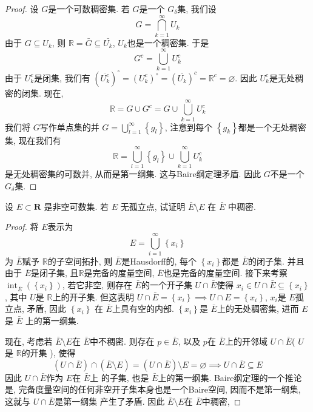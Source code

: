 \documentclass[../main.tex]{subfiles}
\begin{document}
\begin{proof}
   设 \(  G  \)是一个可数稠密集. 若 \(  G  \)是一个 \(  G_{ \delta }  \)集, 我们设 \[
   G= \bigcap _{k= 1}^{\infty}U_{k}
   \]   由于 \(  G\subseteq U_{k}  \), 则 \(  \mathbb{R} = \bar{G}\subseteq \bar{U_{k}}  \), \(  U_{k}  \)也是一个稠密集.   于是 \[
   G^{c}= \bigcup _{k= 1}^{\infty}U_{k}^{c}
   \]由于 \(  U_{k}^{c}  \)是闭集, 我们有  \( \left(  \overline{U_{k}^{c}}  \right)^{\circ}  = \left( U_{k}^{c} \right)^{\circ}  = \left( \overline{U_{k}} \right)^{c} = \mathbb{R} ^{c}= \varnothing \). 因此 \(  U_{k}^{c}  \)是无处稠密的闭集. 现在,  \[
   \mathbb{R} = G\cup G^{c}= G \cup \bigcup _{k= 1}^{\infty}U_{k}^{c}
   \]  我们将 \(  G  \)写作单点集的并 \(  G= \bigcup _{l = 1}^{\infty}\left\{ g_{l} \right\}  \), 注意到每个 \(  \left\{ g_{k} \right\}  \)都是一个无处稠密集, 现在我们有 \[
   \mathbb{R} = \bigcup _{l = 1}^{\infty}\left\{ g_{l} \right\}\cup \bigcup _{k= 1}^{\infty}U_{k}^{c}
   \]   是无处稠密集的可数并, 从而是第一纲集. 这与Baire纲定理矛盾.  因此 \(  G  \)不是一个 \(  G_{ \delta }  \)集.   
\end{proof}

\begin{exercise}{}{}
设 $E \subset \mathbf{R}$ 是非空可数集. 若 $E$ 无孤立点, 试证明 $\bar{E} \setminus E$ 在 $\bar{E}$ 中稠密.
\end{exercise}
\begin{proof}
 将 \(  E  \)表示为 \[
 E= \bigcup _{i= 1}^{\infty}\left\{ x_{i} \right\}
 \] 为 \(  \bar{E}  \)赋予 \(  \mathbb{R}   \)的子空间拓扑, 则 \(  \bar{E}  \)是Hausdorff的, 每个 \(  \left\{ x_{i} \right\}  \)都是 \(  \bar{E}  \)的闭子集. 并且由于 \(  \bar{E}  \)是闭子集, 且\(  \mathbb{R}   \)是完备的度量空间,  \(  \bar{E}  \)也是完备的度量空间.      接下来考察  \(  \operatorname{int}_{\bar{E}}\left( \left\{ x_{i} \right\} \right)   \),  若它非空, 则存在 \(  \bar{E}  \)的一个开子集 \(  U\cap \bar{E}  \)使得 \(  x_{i}\in U\cap \bar{E}\subseteq \left\{ x_{i} \right\}  \), 其中 \(  U  \)是 \(  \mathbb{R}   \)上的开子集. 但这表明 \( U\cap \bar{E}= \left\{ x_{i} \right\} \implies U\cap E= \left\{ x_{i} \right\}\),   \(  x_{i}  \)是 \(  E  \)孤立点, 矛盾, 因此 \(  \left\{ x_{i} \right\}  \)       在 \(  \bar{E}  \)上具有空的内部. \(  \left\{ x_{i} \right\}  \)是 \(  \bar{E}  \)上的无处稠密集, 进而 \(  E  \)是 \(  \bar{E}  \)     上的第一纲集. 

 现在, 考虑若 \(  \bar{E}\setminus E  \)在 \(  \bar{E}  \)中不稠密. 则存在 \(  p \in \bar{E} \),   以及 \(  p  \)在 \(  \bar{E}  \)上的开邻域 \(  U\cap \bar{E}  \)( \(  U  \)是 \(  \mathbb{R}   \)的开集  ), 使得   \[
 \left( U\cap \bar{E} \right)\cap  \left( \bar{E}\setminus E \right)= \left( U\cap \bar{E} \right)\setminus E= \varnothing\implies U\cap \bar{E}\subseteq E   
 \]因此 \(  U  \cap \bar{E}\)作为 \(  E  \)在 \(  \bar{E}  \)上 的子集, 也是 \(  \bar{E}  \)上的第一纲集.    Baire纲定理的一个推论是, 完备度量空间的任何非空开子集本身也是一个Baire空间, 因而不是第一纲集, 这就与 \(  U\cap \bar{E}  \)是第一纲集 产生了矛盾. 因此 \(  \bar{E}\setminus E  \)在 \(  \bar{E}  \)中稠密,  

 
\end{proof}
\end{document}
